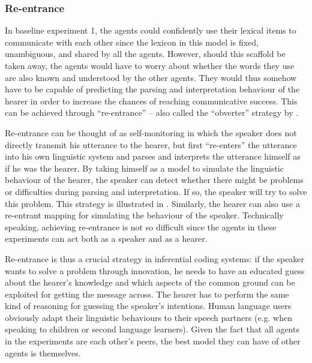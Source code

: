 \subsubsection{Re-entrance}
 In baseline experiment 1, the agents could confidently use their lexical items to communicate with each other since the lexicon in this model is fixed, unambiguous, and shared by all the agents. However, should this scaffold be taken away, the agents would have to worry about whether the words they use are also known and understood by the other agents. They would thus somehow have to be capable of predicting the parsing and interpretation behaviour of the hearer in order to increase the chances of reaching communicative success. This can be achieved through ``re-entrance'' 
\citep{steels03language} -- also called the ``obverter'' strategy by \citet{smith03intelligent}.

Re-entrance can be thought of as self-monitoring in which the speaker does not directly transmit his utterance to the hearer, but first ``re-enters'' the utterance into his own linguistic system and parses and interprets the utterance himself as if he was the hearer. By taking himself as a model to simulate the linguistic behaviour of the hearer, the speaker can detect whether there might be problems or difficulties during parsing and interpretation. If so, the speaker will try to solve this problem. This strategy is illustrated in . Similarly, the hearer can also use a re-entrant mapping for simulating the behaviour of the speaker. Technically speaking, achieving re-entrance is not so difficult since the agents in these experiments can act both as a speaker and as a hearer.

Re-entrance is thus a crucial strategy in inferential coding systems: if the speaker wants to solve a problem through innovation, he needs to have an educated guess about the hearer's knowledge and which aspects of the common ground can be exploited for getting the message across. The hearer has to perform the same kind of reasoning for guessing the speaker's intentions. Human language users obviously adapt their linguistic behaviours to their speech partners (e.g. when speaking to children or second language learners). Given the fact that all agents in the experiments are each other's peers, the best model they can have of other agents is themselves.


